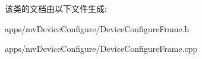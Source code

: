 该类的文档由以下文件生成\+:\begin{DoxyCompactItemize}
\item 
apps/mv\+Device\+Configure/Device\+Configure\+Frame.\+h\item 
apps/mv\+Device\+Configure/Device\+Configure\+Frame.\+cpp\end{DoxyCompactItemize}
